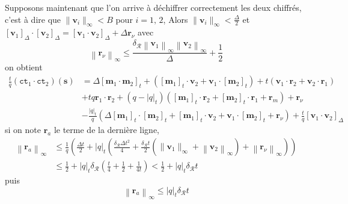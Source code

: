 \documentclass[11pt, headsepline, a4paper, fleqn, oneside]{article}
\begin{document}
Supposons maintenant que l'on arrive à déchiffrer correctement les deux chiffrés, c'est à dire que $\|\boldsymbol{v}_i\|_{\infty} < B$ pour $i=1,\,2$, Alors $\|\boldsymbol{v}_i\|_{\infty} < \frac{\Delta}{2}$ et $\left[\boldsymbol{v}_{1}\right]_{\Delta}\cdot\left[\boldsymbol{v}_{2}\right]_{\Delta}=\left[\boldsymbol{v}_{1} \cdot \boldsymbol{v}_{2}\right]_{\Delta}+\Delta  \boldsymbol{r}_{\nu}$ 
avec \begin{equation}
    \left\|\boldsymbol{r}_{\nu}\right\|_{\infty} \leq \frac{\delta_{\mathcal{R}}\left\|\boldsymbol{v}_{1}\right\|_{\infty}\left\|\boldsymbol{v}_{2}\right\|_{\infty}}{\Delta}+\frac{1}{2}
\end{equation} 
on obtient 
$$\begin{aligned}\frac{t}{q}\left(\texttt{ct}_{1} \cdot \texttt{ct}_{2}\right)(\boldsymbol{s}) &= \Delta\left[\boldsymbol{m}_{1} \cdot \boldsymbol{m}_{2}\right]_{t}+\left(\left[\boldsymbol{m}_{1}\right]_{t} \cdot \boldsymbol{v}_{2}+\boldsymbol{v}_{1} \cdot\left[\boldsymbol{m}_{2}\right]_{t}\right)+t\left(\boldsymbol{v}_{1} \cdot \boldsymbol{r}_{2}+\boldsymbol{v}_{2} \cdot \boldsymbol{r}_{1}\right)  \\&+t q \boldsymbol{r}_{1} \cdot \boldsymbol{r}_{2}+(q-|q|_{t})\left(\left[\boldsymbol{m}_{1}\right]_{t} \cdot \boldsymbol{r}_{2}+\left[\boldsymbol{m}_{2}\right]_{t} \cdot \boldsymbol{r}_{1} + \boldsymbol{r}_{m}\right) + \boldsymbol{r}_{\nu}\\&-\frac{|q|_{t}}{q}\left(\Delta\left[\boldsymbol{m}_{1}\right]_{t} \cdot\left[\boldsymbol{m}_{2}\right]_{t}+\left[\boldsymbol{m}_{1}\right]_{t} \cdot \boldsymbol{v}_{2}+\boldsymbol{v}_{1} \cdot\left[\boldsymbol{m}_{2}\right]_{t} + \boldsymbol{r}_{\nu}\right)+\frac{t}{q}\left[\boldsymbol{v}_{1} \cdot \boldsymbol{v}_{2}\right]_{\Delta}
\end{aligned}$$
si on note $\boldsymbol{r}_{a}$ le terme de la dernière ligne, $$\begin{aligned}\left\|\boldsymbol{r}_{a}\right\|_{\infty} &\leq\frac{1}{q}\left(\frac{\Delta t}{2}+|q|_{t}\left(\frac{\delta_{\mathcal{R}} \Delta t^{2}}{4}+\frac{\delta_{\mathcal{R}} t}{2}\left(\|\boldsymbol{v}_{1}\|_{\infty}+\left\|\boldsymbol{v}_{2}\right\|_{\infty}\right)+\left\|\boldsymbol{r}_{\nu}\right\|_{\infty}\right)\right) \\ &\leq\frac{1}{2}+|q|_{t} \delta_{\mathcal{R}}\left(\frac{t}{4}+\frac{1}{2}+\frac{1}{4 t}\right)<\frac{1}{2}+|q|_{t} \delta_{\mathcal{R}} t \end{aligned}$$
puis \begin{equation}
    \left\|\boldsymbol{r}_{a}\right\|_{\infty} \leq |q|_{t} \delta_{\mathcal{R}} t
\end{equation}
\end{document}
